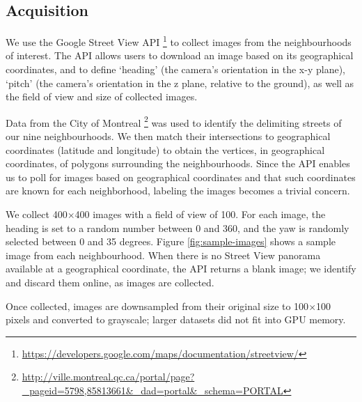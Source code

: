 \documentclass{acm_proc_article-sp}
\begin{document}
\subsection{Acquisition}
We use the Google Street View API \footnote{\url{https://developers.google.com/maps/documentation/streetview/}} to collect images from the neighbourhoods of interest. The API allows users to download an image based on its geographical coordinates, and to define `heading' (the camera's orientation in the x-y plane), `pitch' (the camera's orientation in the z plane, relative to the ground), as well as the field of view and size of collected images. 

Data from the City of Montreal \footnote{\url{http://ville.montreal.qc.ca/portal/page?_pageid=5798,85813661&_dad=portal&_schema=PORTAL}} was used to identify the delimiting streets of our nine neighbourhoods. We then match their intersections to geographical coordinates (latitude and longitude) to obtain the vertices, in geographical coordinates, of polygons surrounding the neighbourhoods.  Since the API enables us to poll for images based on geographical coordinates and that such coordinates are known for each neighborhood, labeling the images becomes a trivial concern.

We collect 400$\times$400 images with a field of view of 100. For each image, the heading is set to a random number between 0 and 360, and the yaw is randomly selected between 0 and 35 degrees. Figure \ref{fig:sample-images} shows a sample image from each neighbourhood. When there is no Street View panorama available at a geographical coordinate, the API returns a blank image; we identify and discard them online, as images are collected.

Once collected, images are downsampled from their original size to 100$\times$100 pixels and converted to grayscale; larger datasets did not fit into GPU memory.
\end{document}
